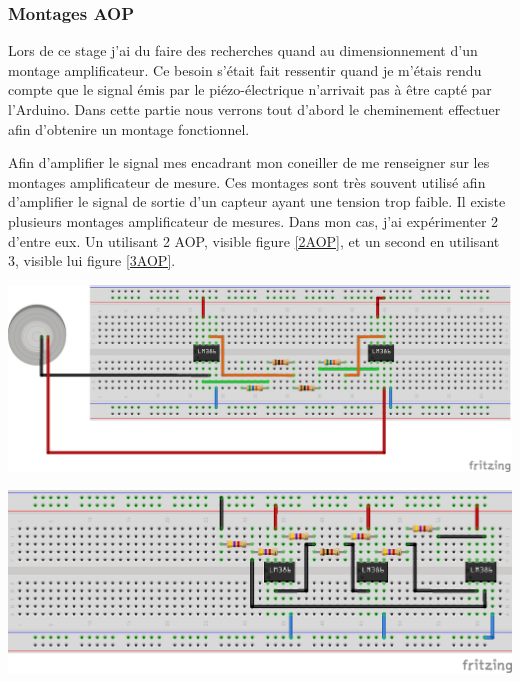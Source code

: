 \documentclass[12pt,french,a4paper]{article}
\begin{document}
\subsubsection{Montages AOP}
Lors de ce stage j'ai du faire des recherches quand au dimensionnement d'un montage amplificateur. Ce besoin s'était fait ressentir quand je m'étais rendu compte que le signal émis par le piézo-électrique n'arrivait pas à être capté par l'Arduino.  Dans cette partie nous verrons tout d'abord le cheminement effectuer afin d'obtenire un montage fonctionnel. 

Afin d'amplifier le signal mes encadrant mon coneiller de me renseigner sur les montages amplificateur de mesure. Ces montages sont très souvent utilisé afin d’amplifier le signal de sortie d’un capteur ayant une tension trop faible.
Il existe plusieurs montages amplificateur de mesures. Dans mon cas, j’ai expérimenter 2 d'entre eux. Un utilisant 2 AOP, visible figure \ref{2AOP}, et un second en utilisant 3, visible lui figure \ref{3AOP}. 

\begin{center}	
\includegraphics[scale=0.80]{../img/instrumentation2aop_bb.png}
\label{2AOP}
\end{center}

\begin{center}	
\includegraphics[scale=1]{../img/instrumentation3aop_bb.png}
\label{3AOP}
\end{center}
\end{document}
